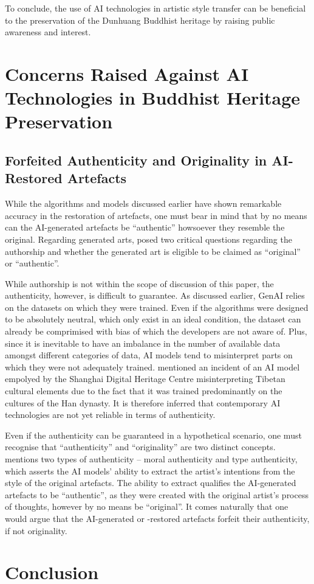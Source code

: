To conclude, the use of AI technologies in artistic style transfer can be beneficial to the preservation of
the Dunhuang Buddhist heritage by raising public awareness and interest.

\section{Concerns Raised Against AI Technologies in Buddhist Heritage Preservation}

\subsection{Forfeited Authenticity and Originality in AI-Restored Artefacts}

While the algorithms and models discussed earlier have shown remarkable accuracy in the restoration of
artefacts, one must bear in mind that by no means can the AI-generated artefacts be ``authentic'' howsoever
they resemble the original. Regarding generated arts,  posed two 
critical questions regarding the authorship and whether the generated art is eligible to be claimed as
``original'' or ``authentic''.

While authorship is not within the scope of discussion of this paper, the authenticity, however, is difficult to guarantee.
As discussed earlier, GenAI relies on the datasets on which they were trained. Even if the algorithms were designed
to be absolutely neutral, which only exist in an ideal condition, the dataset can already be comprimised with bias
of which the developers are not aware of. Plus, since it is inevitable to have an imbalance in the number of
available data amongst different categories of data, AI models tend to misinterpret parts on which they were not
adequately trained.  mentioned an incident of an AI model
empolyed by the Shanghai Digital Heritage Centre misinterpreting Tibetan cultural elements due to the fact that
it was trained predominantly on the cultures of the Han dynasty. It is therefore inferred that contemporary AI
technologies are not yet reliable in terms of authenticity.

Even if the authenticity can be guaranteed in a hypothetical scenario, one must recognise that ``authenticity''
and ``originality'' are two distinct concepts.  mentions two types
of authenticity -- moral authenticity and type authenticity, which asserts the AI models' ability to extract the
artist's intentions from the style of the original artefacts. The ability to extract qualifies the AI-generated
artefacts to be ``authentic'', as they were created with the original artist's process of thoughts, however by no
means be ``original''. It comes naturally that one would argue that the AI-generated or -restored artefacts forfeit
their authenticity, if not originality.

\section{Conclusion}

\printbibliography
